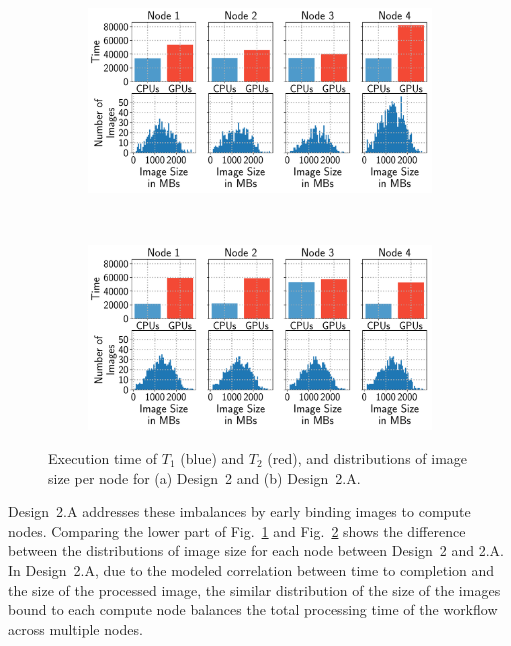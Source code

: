 \begin{figure}[ht!]
	\centering
	\begin{subfigure}[b]{0.95\textwidth}
		\includegraphics[width=\linewidth]{figures/designs/design2_timelines.pdf}
		\caption{}
		\label{fig:design2_timeline}
	\end{subfigure}%
	~ 
	\begin{subfigure}[b]{0.95\textwidth}
		\includegraphics[width=\linewidth]{figures/designs/design2a_timelines.pdf}
		\caption{}
		\label{fig:design2a_timeline}
	\end{subfigure}
	\caption{Execution time of $T_{1}$ (blue) and $T_{2}$ (red),
		and distributions of image size per node for (a) Design~2 and (b)
		Design~2.A.}
	\label{fig:design_balancing}
\end{figure}


Design~2.A addresses these imbalances by early binding images to compute
nodes. Comparing the lower part of Fig.~\ref{fig:design2_timeline} and
Fig.~\ref{fig:design2a_timeline} shows the difference between the
distributions of image size for each node between Design~2 and 2.A. In
Design~2.A, due to the modeled correlation between time to completion and the
size of the processed image, the similar distribution of the size of the
images bound to each compute node balances the total processing time of the
workflow across multiple nodes.

